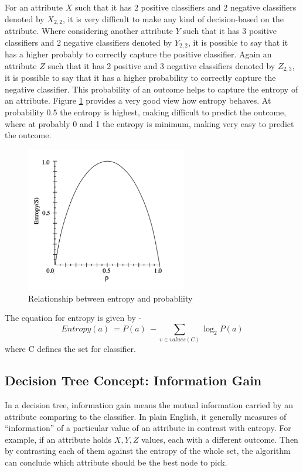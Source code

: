 \documentclass{article}
\begin{document}
For an attribute ${X}$ such that it has 2 positive classifiers and 2 negative classifiers denoted by ${X_{2,2}}$, it is very difficult to make any kind of decision-based on the attribute. Where considering another attribute ${Y}$ such that it has 3 positive classifiers and 2 negative classifiers denoted by ${Y_{2,2}}$, it is possible to say that it has a higher probably to correctly capture the positive classifier. Again an attribute ${Z}$ such that it has 2 positive and 3 negative classifiers denoted by ${Z_{2,3}}$, it is possible to say that it has a higher probability to correctly capture the negative classifier. This probability of an outcome helps to capture the entropy of an attribute. Figure \ref{fig:entropy} provides a very good view how entropy behaves. At probability 0.5 the entropy is highest, making difficult to predict the outcome, where at probably 0 and 1 the entropy is minimum, making very easy to predict the outcome.

\begin{figure}[H]
	\centering
	\includegraphics[width=200pt]{entropy}
	\caption{Relationship between entropy and probabliity}
	\label{fig:entropy}
\end{figure}

The equation for entropy is given by -
\begin{equation}
Entropy(a)\ = P(a)\ - \sum_{v \in values(C)}\log_{2}{P(a)}
\end{equation}
where C defines the set for classifier.

\subsection{Decision Tree Concept: Information Gain}
In a decision tree, information gain means the mutual information carried by an attribute comparing to the classifier\cite{wikiinfogain}. In plain English, it generally measures of ``information'' of a particular value of an attribute in contrast with entropy. For example, if an attribute holds ${X,Y,Z}$ values, each with a different outcome. Then by contrasting each of them against the entropy of the whole set, the algorithm can conclude which attribute should be the best node to pick.
\end{document}
